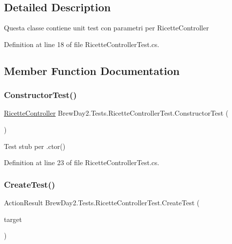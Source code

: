 \subsection{Detailed Description}
Questa classe contiene unit test con parametri per Ricette\+Controller



Definition at line 18 of file Ricette\+Controller\+Test.\+cs.



\subsection{Member Function Documentation}
\mbox{\label{class_brew_day2_1_1_tests_1_1_ricette_controller_test_a5dcf0005fef9f12eb8c5914cc3115273}} 
\subsubsection{\texorpdfstring{Constructor\+Test()}{ConstructorTest()}}
{\footnotesize\ttfamily \mbox{\hyperlink{class_brew_day2_1_1_controllers_1_1_ricette_controller}{Ricette\+Controller}} Brew\+Day2.\+Tests.\+Ricette\+Controller\+Test.\+Constructor\+Test (\begin{DoxyParamCaption}{ }\end{DoxyParamCaption})}



Test stub per .ctor()



Definition at line 23 of file Ricette\+Controller\+Test.\+cs.

\mbox{\label{class_brew_day2_1_1_tests_1_1_ricette_controller_test_a30c535ac99265b5a206569fb63178500}} 
\subsubsection{\texorpdfstring{Create\+Test()}{CreateTest()}}
{\footnotesize\ttfamily Action\+Result Brew\+Day2.\+Tests.\+Ricette\+Controller\+Test.\+Create\+Test (\begin{DoxyParamCaption}\item[{\mbox{[}\+Pex\+Assume\+Under\+Test\mbox{]} \mbox{\hyperlink{class_brew_day2_1_1_controllers_1_1_ricette_controller}{Ricette\+Controller}}}]{target }\end{DoxyParamCaption})}



